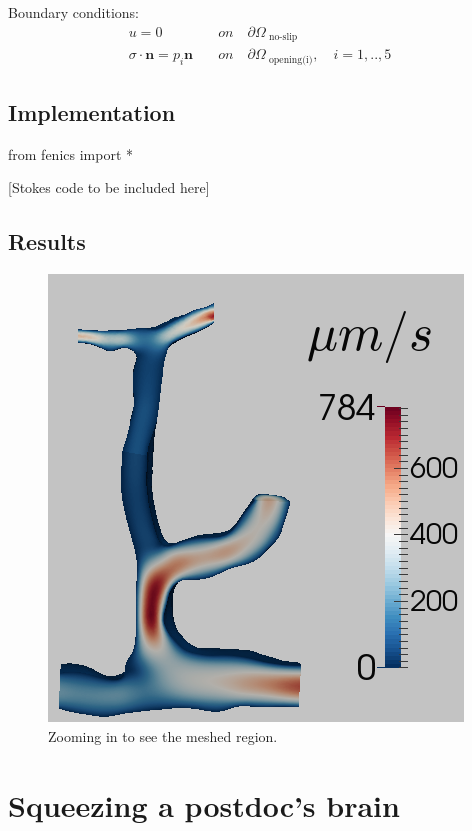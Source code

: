 \documentclass[epsfig,11pt]{article}
\begin{document}
Boundary conditions:
\begin{align*}
u = 0 \quad &on \quad \partial \Omega_{\text{ no-slip}} \\
\sigma \cdot \mathbf{n} = p_i\mathbf{n} \quad &on \quad \partial \Omega_\text{ opening(i)},\quad i=1,..,5
\end{align*}

\subsection{Implementation}

\begin{python}
from fenics import *

[Stokes code to be included here]
\end{python}


\subsection{Results}


\begin{figure}[h!] 
\begin{center}
  \includegraphics[scale=0.4]{result.png}
  \end{center}
  \caption{Zooming in to see the meshed region.}
\end{figure}


\section{Squeezing a postdoc's brain}
\end{document}
